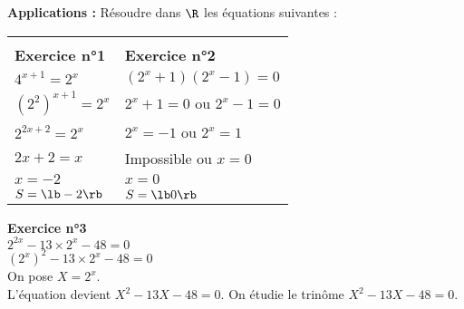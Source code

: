\newpage

\vspace*{-.5cm}

\textbf{Applications :} Résoudre dans $\R$ les équations suivantes :  \\

\begin{tabular}{ll}
\hspace*{7cm} & \hspace*{5cm} \\
\hspace*{-.3cm} \textbf{Exercice n°1} & \textbf{Exercice n°2} \vspace*{.3cm}  \\
\hspace*{-.3cm} $4^{x+1} = 2^x$ & $\left(2^x + 1\right)\left(2^x - 1\right) = 0$ \vspace*{.3cm} \\
\hspace*{-.3cm} $\left(2^2\right)^{x+1} = 2^x$ & $2^x + 1 = 0$ ou $2^x - 1 = 0$ \vspace*{.3cm} \\
\hspace*{-.3cm} $2^{2x + 2} = 2^x$ & $2^x = -1$ ou $2^x = 1$ \vspace*{.3cm} \\
\hspace*{-.3cm} $2x + 2 = x$ & Impossible ou $x=0$ \vspace*{.3cm} \\
\hspace*{-.3cm} $x = -2$ & $x=0$ \vspace*{.6cm} \\
\hspace*{-.3cm} $S = \lb -2 \rb $ & $S = \lb 0 \rb $ \\
\end{tabular}

\vspace*{1cm}

\textbf{Exercice n°3} \\

$2^{2x} - 13 \times 2^x - 48 = 0$ \\

$\left(2^x\right)^2 - 13 \times 2^x - 48 = 0$ \\

On pose $X = 2^x$. \\

L'équation devient $X^2 - 13X - 48 = 0$. On étudie le trinôme $X^2 - 13X - 48 = 0$. \\

